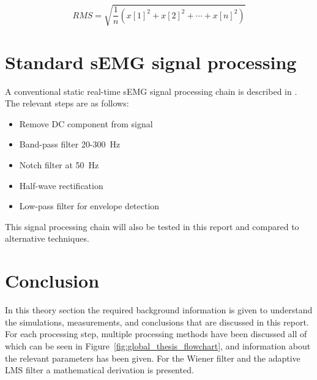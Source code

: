 \begin{equation}
    RMS = \sqrt{\frac{1}{n} (x[1]^2 + x[2]^2 + \cdots + x[n]^2)}
    \label{eq:rms}
\end{equation}

\section{Standard sEMG signal processing}\label{section:standard_semg_processing}
A conventional static real-time sEMG signal processing chain is described in \cite{muscle_force_estimation}. The relevant steps are as follows:
\begin{itemize}
    \item Remove DC component from signal
    \item Band-pass filter 20-\SI{300}{\hertz}
    \item Notch filter at \SI{50}{\hertz}
    \item Half-wave rectification
    \item Low-pass filter for envelope detection
\end{itemize}

This signal processing chain will also be tested in this report and compared to alternative techniques.

\section{Conclusion}
In this theory section the required background information is given to understand the simulations, measurements, and conclusions that are discussed in this report. For each processing step, multiple processing methods have been discussed all of which can be seen in Figure~\ref{fig:global_thesis_flowchart}, and information about the relevant parameters has been given. For the Wiener filter and the adaptive LMS filter a mathematical derivation is presented.